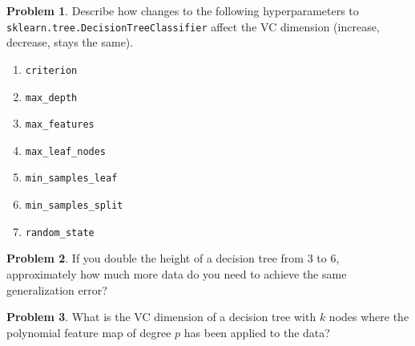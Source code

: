\documentclass[10pt]{exam}
\theoremstyle{definition}
\newtheorem{problem}{Problem}
\newtheorem{theorem}{Theorem}
\newcommand{\Ein}{E_{\text{in}}}
\begin{document}

\newpage
\begin{problem}
    Describe how changes to the following hyperparameters to \lstinline{sklearn.tree.DecisionTreeClassifier} affect the VC dimension (increase, decrease, stays the same).
    \begin{enumerate}
        \item \lstinline{criterion}
            \vspace{0.75in}
        \item \lstinline{max_depth}
            \vspace{0.75in}
        \item \lstinline{max_features}
            \vspace{0.75in}
        \item \lstinline{max_leaf_nodes}
            \vspace{0.75in}
        \item \lstinline{min_samples_leaf}
            \vspace{0.75in}
        \item \lstinline{min_samples_split}
            \vspace{0.75in}
        \item \lstinline{random_state}
            \vspace{0.75in}
    \end{enumerate}
\end{problem}

\newpage

\begin{problem}
    If you double the height of a decision tree from 3 to 6, approximately how much more data do you need to achieve the same generalization error?
\end{problem}

\vspace{4in}
\begin{problem}
    What is the VC dimension of a decision tree with $k$ nodes where the polynomial feature map of degree $p$ has been applied to the data?
\end{problem}
\end{document}
